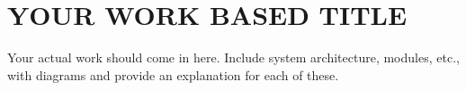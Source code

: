 
\chapter{\uppercase{Your work based title}} %
\label{ch:chap3} %
Your actual work should come in here. Include system architecture, modules, etc., with diagrams and provide an explanation for each of these. 


